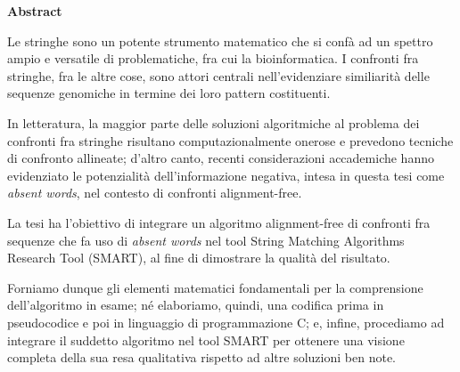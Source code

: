 \clearpage
\setcounter{page}{1}

{\Huge \textbf{Abstract}}

\vspace{15mm}

Le stringhe sono un potente strumento matematico che si confà ad un spettro ampio e versatile di problematiche, fra cui la bioinformatica. I confronti fra stringhe, fra le altre cose, sono attori centrali nell'evidenziare similiarità delle sequenze genomiche in termine dei loro pattern costituenti.

In letteratura, la maggior parte delle soluzioni algoritmiche al problema dei confronti fra stringhe risultano computazionalmente onerose e prevedono tecniche di confronto allineate; d'altro canto, recenti considerazioni accademiche hanno evidenziato le potenzialità dell'informazione negativa, intesa in questa tesi come \textit{absent words}, nel contesto di confronti alignment-free.

La tesi ha l'obiettivo di integrare un algoritmo alignment-free di confronti fra sequenze che fa uso di \textit{absent words} nel tool String Matching Algorithms Research Tool (SMART), al fine di dimostrare la qualità del risultato.

Forniamo dunque gli elementi matematici fondamentali per la comprensione dell'algoritmo in esame; né elaboriamo, quindi, una codifica prima in pseudocodice e poi in linguaggio di programmazione C; e, infine, procediamo ad integrare il suddetto algoritmo nel tool SMART per ottenere una visione completa della sua resa qualitativa rispetto ad altre soluzioni ben note.